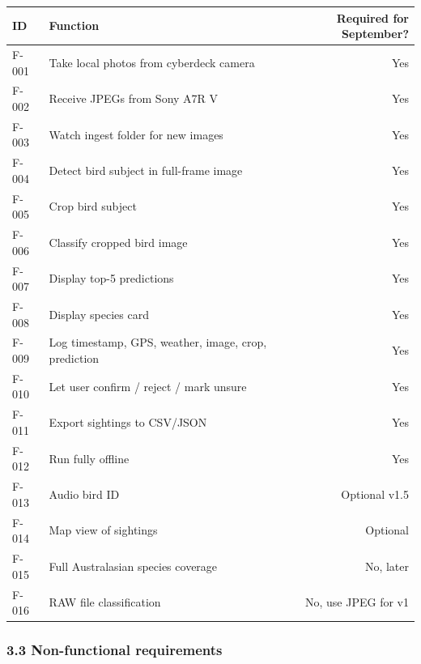 \documentclass[
  11pt,
]{article}
\begin{document}
\begin{longtable}[]{@{}llr@{}}
\toprule\noalign{}
ID & Function & Required for September? \\
\midrule\noalign{}
\endhead
\bottomrule\noalign{}
\endlastfoot
F-001 & Take local photos from cyberdeck camera & Yes \\
F-002 & Receive JPEGs from Sony A7R V & Yes \\
F-003 & Watch ingest folder for new images & Yes \\
F-004 & Detect bird subject in full-frame image & Yes \\
F-005 & Crop bird subject & Yes \\
F-006 & Classify cropped bird image & Yes \\
F-007 & Display top-5 predictions & Yes \\
F-008 & Display species card & Yes \\
F-009 & Log timestamp, GPS, weather, image, crop, prediction & Yes \\
F-010 & Let user confirm / reject / mark unsure & Yes \\
F-011 & Export sightings to CSV/JSON & Yes \\
F-012 & Run fully offline & Yes \\
F-013 & Audio bird ID & Optional v1.5 \\
F-014 & Map view of sightings & Optional \\
F-015 & Full Australasian species coverage & No, later \\
F-016 & RAW file classification & No, use JPEG for v1 \\
\end{longtable}

\subsubsection{3.3 Non-functional
requirements}\label{non-functional-requirements}
\end{document}

